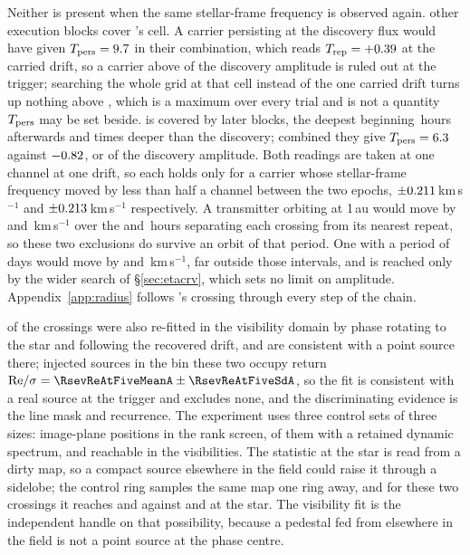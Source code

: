Neither is present when the same stellar-frame frequency is observed again.
\EvANRep{} other execution blocks cover \EvAStar's cell. A carrier persisting
at the discovery flux would have given $T_{\rm pers}=9.7$ in their
combination, which reads $T_{\rm rep}=+0.39$ at the carried drift, so a
carrier above \RcSxFive{} of the discovery amplitude is ruled out at the
trigger; searching the whole grid at that cell instead of the one carried
drift turns up nothing above \EvATAnyDrift, which is a maximum over every
trial and is not a quantity $T_{\rm pers}$ may be set beside. \EvBStar{} is
covered by \RcCpNRep{} later blocks, the deepest beginning \EvBNearH\,hours
afterwards and \EvBDeepRatio{} times deeper than the discovery; combined they
give $T_{\rm pers}=6.3$ against $-0.82$, or \RcCpFive{} of the
discovery amplitude. Both readings are taken at one channel at one drift, so
each holds only for a carrier whose stellar-frame frequency moved by less
than half a channel between the two epochs,
$\pm0.211$\,km\,s$^{-1}$ and $\pm0.213$\,km\,s$^{-1}$ respectively. A
transmitter orbiting at 1\,au would move by \RqOrbSx{} and \RqOrbCp\,km\,s$^{-1}$
over the \RcSxNearH{} and \RcCpNearH\,hours separating each crossing from its
nearest repeat, so these two exclusions do survive an orbit of that period.
One with a period of days would move by \RqGridSx{} and \RqGridCp\,km\,s$^{-1}$,
far outside those intervals, and is reached only by the wider search of
\S\ref{sec:etacrv}, which sets no limit on amplitude.
Appendix~\ref{app:radius} follows \EvBStar's crossing through every step of
the chain.

\LgNFit{} of the \NCross{} crossings were also re-fitted in the visibility
domain by phase rotating to the star and following the recovered drift, and
\LgNLocalCor{} are consistent with a point source there; injected sources in
the bin these two occupy return
${\rm Re}/\sigma=\RsevReAtFiveMeanA\pm\RsevReAtFiveSdA$, so the fit is
consistent with a real source at the trigger and excludes none, and the
discriminating evidence is the line mask and recurrence. The experiment uses
three control sets of three sizes: \NCtrl{} image-plane positions in the rank
screen, \RcNRetCtrl{} of them with a retained dynamic spectrum, and
\RcNVisCtrl{} reachable in the visibilities. The statistic at the star is read
from a dirty map, so a compact source elsewhere in the field could raise it
through a sidelobe; the control ring samples the same map one ring away, and
for these two crossings it reaches \EvACtrlMax{} and \EvBCtrlMax{} against
\EvAStar{} and \EvBStar{} at the star. The visibility fit is the independent
handle on that possibility, because a pedestal fed from elsewhere in the field
is not a point source at the phase centre.

